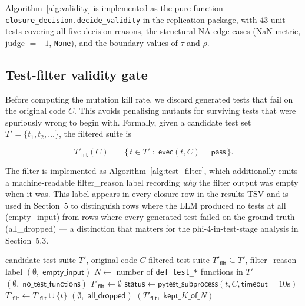 Algorithm~\ref{alg:validity} is implemented as the pure function \texttt{closure\_decision.decide\_validity} in the replication package, with 43 unit tests covering all five decision reasons, the structural-NA edge cases (NaN metric, judge $= -1$, \texttt{None}), and the boundary values of $\tau$ and $\rho$.

\subsection{Test-filter validity gate}

Before computing the mutation kill rate, we discard generated tests that fail on the original code $C$. This avoids penalising mutants for surviving tests that were spuriously wrong to begin with. Formally, given a candidate test set $T' = \{t_1, t_2, \ldots\}$, the filtered suite is

\begin{equation}
  T'_{\textsf{filt}}(C)
  \;=\;
  \bigl\{\, t \in T' \;:\; \textsf{exec}(t, C) = \textsf{pass} \,\bigr\}.
  \label{eq:filter}
\end{equation}

The filter is implemented as Algorithm~\ref{alg:test_filter}, which additionally emits a machine-readable \textsf{filter\_reason} label recording \emph{why} the filter output was empty when it was. This label appears in every closure row in the results TSV and is used in Section~5 to distinguish rows where the LLM produced no tests at all (\textsf{empty\_input}) from rows where every generated test failed on the ground truth (\textsf{all\_dropped}) --- a distinction that matters for the phi-4-in-test-stage analysis in Section~5.3.

\begin{algorithm}[h]
\caption{Test-filter validity gate (implements Eq.~\ref{eq:filter})}
\label{alg:test_filter}
\begin{algorithmic}[1]
\Require candidate test suite $T'$, original code $C$
\Ensure filtered test suite $T'_{\textsf{filt}} \subseteq T'$, \textsf{filter\_reason} label
  \State \Return $(\emptyset,\; \textsf{empty\_input})$
\EndIf
\State $N \leftarrow$ number of \texttt{def test\_*} functions in $T'$
  \State \Return $(\emptyset,\; \textsf{no\_test\_functions})$
\EndIf
\State $T'_{\textsf{filt}} \leftarrow \emptyset$
  \State $\textsf{status} \leftarrow \textsf{pytest\_subprocess}(t, C, \textsf{timeout} = 10\text{s})$
    \State $T'_{\textsf{filt}} \leftarrow T'_{\textsf{filt}} \cup \{t\}$
  \EndIf
\EndFor
{}
  \State \Return $(\emptyset,\; \textsf{all\_dropped})$ 
\EndIf
\State \Return $(T'_{\textsf{filt}},\; \textsf{kept}\_K\_\textsf{of}\_N)$
\end{algorithmic}
\end{algorithm}

